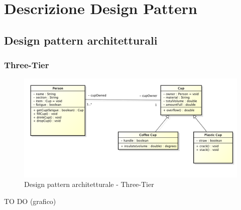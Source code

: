 %




\section{Descrizione Design Pattern} %
\label{sec:descdp}
	\subsection{Design pattern architetturali} %

		\subsubsection{Three-Tier} %
		
		
		\begin{figure}[htbp]
			\centering
			\centerline{\includegraphics[scale=0.3]{./images/example_graph.png}}
			\caption{Design pattern architetturale - Three-Tier}
		\end{figure}
		TO DO (grafico)
		
